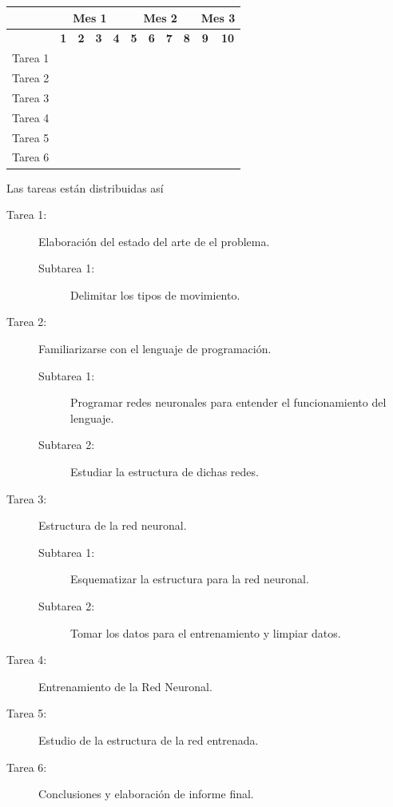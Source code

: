 \documentclass[titlepage,11pt]{article}
\begin{document}
\begin{longtable}[h]{|l|c|c|c|c|c|c|c|c|c|c|}
  \hline & \multicolumn{4}{c|}{\textbf{Mes 1}} &
  \multicolumn{4}{c|}{\textbf{Mes 2}} & \multicolumn{2}{c|}{\textbf{Mes 3}}\\
  \hline & \textbf{1}& \textbf{2}& \textbf{3}& \textbf{4} &
  \textbf{5}& \textbf{6}& \textbf{7}& \textbf{8} & \textbf{9}& \textbf{10} \\
  \hline
  Tarea 1 & \multicolumn{1}{c}{\cellcolor{gray!50}}& & & & & & & & & \\ \hline
  Tarea 2 & & \multicolumn{2}{c}{\cellcolor{gray!50}} & & & & & & & \\ \hline
  Tarea 3 & & & & \multicolumn{2}{c}{\cellcolor{gray!50}} & & & & & \\ \hline
  Tarea 4 & & & & & & \multicolumn{2}{c}{\cellcolor{gray!50}} & & & \\ \hline
  Tarea 5 & & & & & & & & \multicolumn{2}{c}{\cellcolor{gray!50}}  & \\ \hline
  Tarea 6 & & & & & & & & & &\multicolumn{1}{c}{\cellcolor{gray!50}} \\ \hline
\end{longtable}

Las tareas están distribuidas así
\begin{description}
\item[Tarea 1:] Elaboración del estado del arte de el problema.
	\begin{description}
		\item[Subtarea 1:] Delimitar los tipos de movimiento.
	\end{description}
\item[Tarea 2:] Familiarizarse con el lenguaje de programación.
	\begin{description}
		\item[Subtarea 1:] Programar redes neuronales para entender el funcionamiento del lenguaje. 
		\item[Subtarea 2:] Estudiar la estructura de dichas redes.
	\end{description}
\item[Tarea 3:] Estructura de la red neuronal.
	\begin{description}
		\item[Subtarea 1:] Esquematizar la estructura para la red neuronal.
		\item[Subtarea 2:] Tomar los datos para el entrenamiento y limpiar datos.
	\end{description}
\item[Tarea 4:] Entrenamiento de la Red Neuronal.
\item[Tarea 5:] Estudio de la estructura de la red entrenada.
\item[Tarea 6:] Conclusiones y elaboración de informe final.
\end{description}
\end{document}
